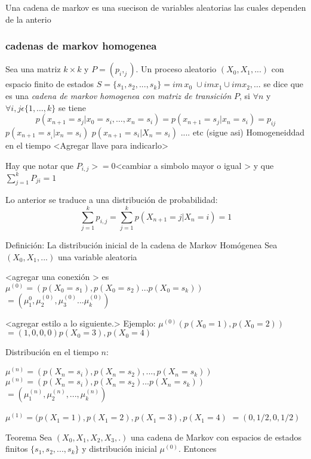 Una cadena de markov es una suecison de variables aleatorias las
cuales dependen de la anterio



\subsubsection{cadenas de markov homogenea}

Sea una matriz $k \times k$ y $P = (p_i,_j)$. Un proceso aleatorio
$(X_0,X_1,...)$ con espacio finito de estados
$S = \{s_1,s_2,...,s_k\}= im \, x_0 \; \cup im x_1 \cup imx_2, \ldots$
se dice que es una \emph{cadena de markov homogenea con matriz de
transici\'on} $P$, si $\forall n$ y
$\forall i,j \epsilon \{1,\ldots,k\} $ se tiene
\[p(x_{n +1} = s_j | x_0 = s_i,\dots, x_n = s_i) = p (x_{n+1} = s_j |
  x_n = s_i) = p_{ij}\]
$p(x_{n + 1} = s_{_i} |x_n = s_i )$
$p(x_{n+1} = s_i | X _n = s_i) $ .... etc (sigue asi) Homogeneiddad en
el tiempo <Agregar llave para indicarlo>

Hay que notar que $P_{i,j} >= 0$<cambiar a simbolo mayor o igual > y
que $\sum_{j=1}^{k}P_{ji} = 1$

Lo anterior se traduce a una distribuci\'on de probabilidad:
$$\sum_{j = 1}^{k}p_{i,j} = \sum_{j = 1}^k p(X_{n +1} = j | X_n = i) =
1$$

 Definici\'on: La distribuci\'on inicial de
la cadena de Markov Hom\'ogenea Sea $(X_0,X_1,...) $ una variable
aleatoria

<agregar una conexi\'on > es
$\mu^{(0)} = (p(X_0 = s_1), p(X_0 = s_2) ...p(X_0 = s_k))$
$ = ( \mu_1^0, \mu_2^{(0)},\mu_3^{(0)} ... \mu_k^{(0)}) $

<agregar estilo a lo siguiente.> Ejemplo:
$\mu^{(0)} (p(X_0 = 1), p(X_0 = 2)) $
$= (1, 0, 0, 0)p(X_0 = 3), p(X_0 = 4)$

Distribuci\'on en el tiempo $n$:

$\mu^{(n)} = (p(X_n = s_i), p(X_n = s_2), ..., p(X_n = s_k))$
$\mu^{(n)} = (p(X_n = s_i),p(X_n = s_2) ... p(X_n = s_k))$
$= (\mu_1^{(n)}, \mu_2^{(n)}, ..., \mu_k^{(n)} )$





$\mu^{(1)} = (p(X_1 = 1), p(X_1 = 2), p(X_1 = 3), p(X_1 = 4)$
$ = (0, 1/2, 0, 1/2) $

Teorema Sea $(X_0, X_1, X_2, X_3, . )$ una cadena de
Markov con espacios de estados finitos $\{s_1,s_2,...,s_k\}$ y
distribuci\'on inicial $\mu^{(0)}$. Entonces\\

